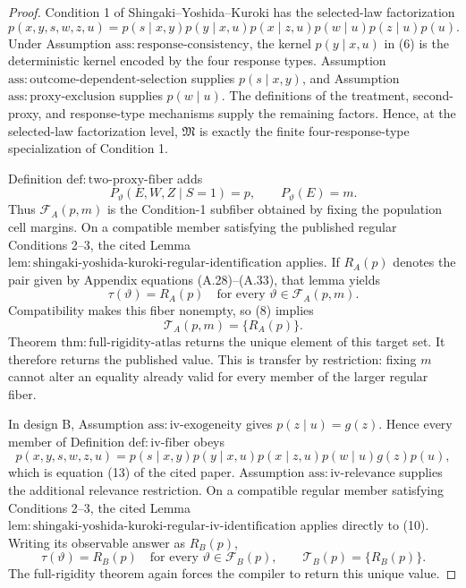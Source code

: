 \documentclass{article}
\begin{document}
\begin{proof}
Condition 1 of Shingaki--Yoshida--Kuroki has the selected-law factorization
\[
 p(x,y,s,w,z,u)
 =p(s\mid x,y)p(y\mid x,u)p(x\mid z,u)
   p(w\mid u)p(z\mid u)p(u).                              \tag{6}
\]
Under Assumption \(\mathrm{ass{:}response\text{-}consistency}\), the kernel \(p(y\mid x,u)\) in (6) is the deterministic kernel encoded by the four response types.  Assumption \(\mathrm{ass{:}outcome\text{-}dependent\text{-}selection}\) supplies \(p(s\mid x,y)\), and Assumption \(\mathrm{ass{:}proxy\text{-}exclusion}\) supplies \(p(w\mid u)\).  The definitions of the treatment, second-proxy, and response-type mechanisms supply the remaining factors.  Hence, at the selected-law factorization level, \(\mathfrak M\) is exactly the finite four-response-type specialization of Condition 1.

Definition \(\mathrm{def{:}two\text{-}proxy\text{-}fiber}\) adds
\[
 P_{\vartheta}(E,W,Z\mid S=1)=p,
 \qquad
 P_{\vartheta}(E)=m.                                      \tag{7}
\]
Thus \(\mathcal F_A(p,m)\) is the Condition-1 subfiber obtained by fixing the population cell margins.  On a compatible member satisfying the published regular Conditions 2--3, the cited Lemma \(\mathrm{lem{:}shingaki\text{-}yoshida\text{-}kuroki\text{-}regular\text{-}identification}\) applies.  If \(R_A(p)\) denotes the pair given by Appendix equations (A.28)--(A.33), that lemma yields
\[
 \tau(\vartheta)=R_A(p)
 \quad\text{for every }\vartheta\in\mathcal F_A(p,m).    \tag{8}
\]
Compatibility makes this fiber nonempty, so (8) implies
\[
 \mathcal T_A(p,m)=\{R_A(p)\}.                            \tag{9}
\]
Theorem \(\mathrm{thm{:}full\text{-}rigidity\text{-}atlas}\) returns the unique element of this target set.  It therefore returns the published value.  This is transfer by restriction: fixing \(m\) cannot alter an equality already valid for every member of the larger regular fiber.

In design B, Assumption \(\mathrm{ass{:}iv\text{-}exogeneity}\) gives \(p(z\mid u)=g(z)\).  Hence every member of Definition \(\mathrm{def{:}iv\text{-}fiber}\) obeys
\[
 p(x,y,s,w,z,u)
 =p(s\mid x,y)p(y\mid x,u)p(x\mid z,u)
   p(w\mid u)g(z)p(u),                                    \tag{10}
\]
which is equation (13) of the cited paper.  Assumption \(\mathrm{ass{:}iv\text{-}relevance}\) supplies the additional relevance restriction.  On a compatible regular member satisfying Conditions 2--3, the cited Lemma \(\mathrm{lem{:}shingaki\text{-}yoshida\text{-}kuroki\text{-}regular\text{-}iv\text{-}identification}\) applies directly to (10).  Writing its observable answer as \(R_B(p)\),
\[
 \tau(\vartheta)=R_B(p)
 \quad\text{for every }\vartheta\in\mathcal F_B(p),
 \qquad
 \mathcal T_B(p)=\{R_B(p)\}.                             \tag{11}
\]
The full-rigidity theorem again forces the compiler to return this unique value.


\end{proof}
\end{document}
